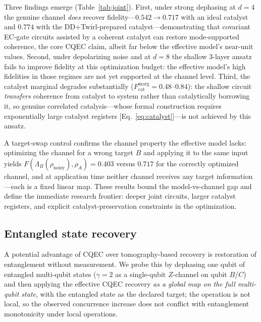 \documentclass[a4paper,twocolumn]{quantumarticle}
\begin{document}
Three findings emerge (Table~\ref{tab:joint}).
First, under strong dephasing at $d = 4$ the genuine channel \emph{does} recover fidelity---$0.542 \to 0.717$ with an ideal catalyst and $0.774$ with the DD+Twirl-prepared catalyst---demonstrating that covariant EC-gate circuits assisted by a coherent catalyst can restore mode-supported coherence, the core CQEC claim, albeit far below the effective model's near-unit values.
Second, under depolarizing noise and at $d = 8$ the shallow 3-layer ansatz fails to improve fidelity at this optimization budget: the effective model's high fidelities in those regimes are not yet supported at the channel level.
Third, the catalyst marginal degrades substantially ($F_\mathrm{cat}^\mathrm{marg} = 0.48$--$0.84$): the shallow circuit \emph{transfers} coherence from catalyst to system rather than catalytically borrowing it, so genuine correlated catalysis---whose formal construction requires exponentially large catalyst registers [Eq.~\eqref{eq:catalyst}]---is not achieved by this ansatz.

A target-swap control confirms the channel property the effective model lacks: optimizing the channel for a wrong target $B$ and applying it to the same input yields $F(\Lambda_B(\rho_\mathrm{noisy}), \rho_A) = 0.403$ versus $0.717$ for the correctly optimized channel, and at application time neither channel receives any target information---each is a fixed linear map.
These results bound the model-vs-channel gap and define the immediate research frontier: deeper joint circuits, larger catalyst registers, and explicit catalyst-preservation constraints in the optimization.


\subsection{Entangled state recovery}
\label{sec:entangled}

A potential advantage of CQEC over tomography-based recovery is restoration of entanglement without measurement.
We probe this by dephasing one qubit of entangled multi-qubit states ($\gamma = 2$ as a single-qubit $Z$-channel on qubit $B$/$C$) and then applying the effective CQEC recovery \emph{as a global map on the full multi-qubit state}, with the entangled state as the declared target; the operation is not local, so the observed concurrence increase does not conflict with entanglement monotonicity under local operations.
\end{document}

